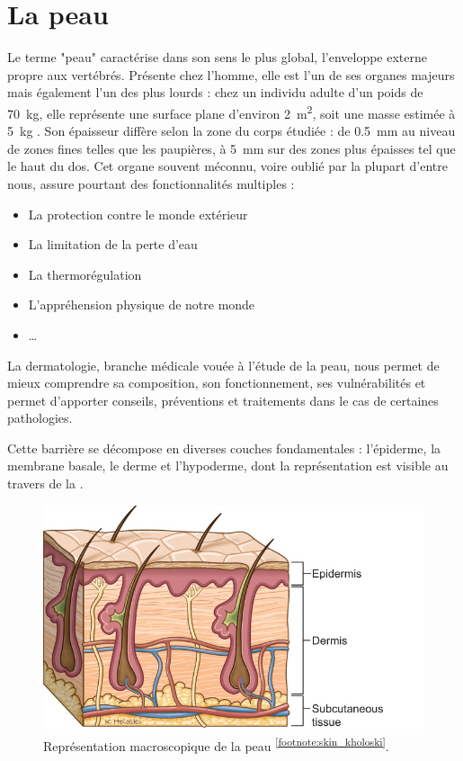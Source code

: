 \chapter{La peau}
\label{chap:chapter_1}
Le terme "peau" caractérise dans son sens le plus global, l’enveloppe externe propre aux vertébrés. Présente chez l’homme, elle est l’un de ses organes majeurs mais également l’un des plus lourds : chez un individu adulte d’un poids de \SI{70}{\kilo\gram}, elle représente une surface plane d’environ \SI{2}{\metre\squared}, soit une masse estimée à \SI{5}{\kilo\gram} \cite{McGrath2010}. Son épaisseur diffère selon la zone du corps étudiée : de \SI{0,5}{\milli\metre} au niveau de zones fines telles que les paupières, à \SI{5}{\milli\metre} sur des zones plus épaisses tel que le haut du dos. Cet organe souvent méconnu, voire oublié par la plupart d’entre nous, assure pourtant des fonctionnalités multiples : 
\begin{itemize}
\item La protection contre le monde extérieur
\item La limitation de la perte d’eau
\item La thermorégulation
\item L’appréhension physique de notre monde
\item \ldots
\end{itemize}\par
La dermatologie, branche médicale vouée à l’étude de la peau, nous permet de mieux comprendre sa composition, son fonctionnement, ses vulnérabilités et permet d’apporter conseils, préventions et traitements dans le cas de certaines pathologies.\par
Cette barrière se décompose en diverses couches fondamentales : l’épiderme, la membrane basale, le derme et l’hypoderme, dont la représentation est visible au travers de la .\par
\begin{figure}[H]
    \centering
    \includegraphics[width=0.6\linewidth]{contents/chapter_1/resources/skin_kholoski.png}
    \caption{Représentation macroscopique de la peau \textsuperscript{\ref{footnote:skin_kholoski}}.}
    \label{fig:skin_kholoski}
\end{figure}
\addtocounter{footnote}{1}
\clearpage

